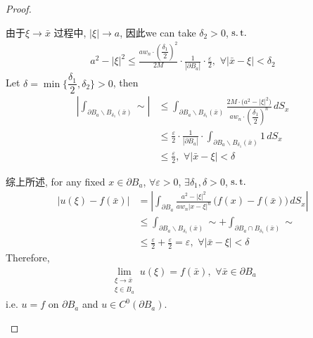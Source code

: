 \begin{thm}
\begin{proof}
\begin{enumerate}
\begin{enumerate}
					\newpage
					
					由于$\xi \to \bar{x}$ 过程中, $| \xi | \to a$, 因此we can take $\delta_2 > 0$, $\operatorname{s.t.}$ 
					\begin{align*}
						a^2 - | \xi |^2 
						\leq \frac{a w_n \cdot \left( \dfrac{\delta_1}{2} \right)^2}{2M} \cdot \frac{1}{| \partial B_a |} \cdot \frac{\varepsilon}{2} , \,\, \forall | \bar{x} - \xi | < \delta_2
					\end{align*}
					Let $\delta = \min \{ \dfrac{\delta_1}{2} , \delta_2 \} > 0$, then
					\begin{align*}
						\left| \int_{\partial B_a \backslash B_{\delta_1}(\bar{x})} \sim \right| 
						&\leq \int_{\partial B_a \backslash B_{\delta_1}(\bar{x})} \frac{2M \cdot \Big( a^2 - | \xi |^2 \Big) }{a w_n \cdot \left( \dfrac{\delta_1}{2} \right)^n} \, dS_x \\
						&\leq \frac{\varepsilon}{2} \cdot \frac{1}{| \partial B_a |} \cdot \int_{\partial B_a \backslash B_{\delta_1}(\bar{x})} 1 \, dS_x \\
						&\leq \frac{\varepsilon}{2} , \,\, \forall | \bar{x} - \xi | < \delta
					\end{align*}
				\end{enumerate}
				
				\vspace*{2em}
				
				\hspace{-1.95em}综上所述, for any fixed $x \in \partial B_a$, $\forall \varepsilon > 0$, $\exists \delta_1 , \delta > 0$, $\operatorname{s.t.}$
				\begin{align*}
					\left| u(\xi) - f(\bar{x}) \right| 
					&= \left| \int_{\partial B_a} \frac{a^2 - | \xi |^2}{a w_n | x - \xi |^n} \, \Big( f(x) - f(\bar{x}) \Big) \, dS_x \right| \\
					&\leq \int_{\partial B_a \backslash B_{\delta_1}(\bar{x})} \sim + \int_{\partial B_a \cap B_{\delta_1}(\bar{x})} \sim \\
					&\leq \frac{\varepsilon}{2} + \frac{\varepsilon}{2} 
					= \varepsilon , \,\, \forall | \bar{x} - \xi | < \delta
				\end{align*}
				Therefore, 
				\begin{align*}
					\lim_{\substack{\xi \to \bar{x} \\ \xi \in B_a}} u(\xi) = f(\bar{x}) , \,\, \forall \bar{x} \in \partial B_a
				\end{align*}
				i.e. $u = f$ on $\partial B_a$ and $u \in C^0\left( \partial B_a \right)$. 
			\end{enumerate}
		\end{proof}
	\end{thm}

